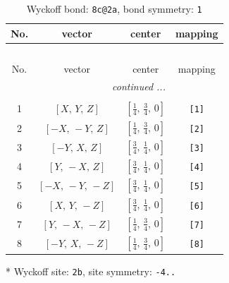\documentclass[fleqn,8pt]{jsarticle}
\begin{document}
\renewcommand{\arraystretch}{1.2}
\begin{longtable}{cccc}
\caption{Wyckoff bond: {\tt 8c@2a}, bond symmetry: {\tt 1}}
 \\
 \hline \hline
No. & vector & center & mapping \\ \hline \endfirsthead

\multicolumn{3}{l}{\tablename\ \thetable{}} \\
 \hline \hline
No. & vector & center & mapping \\ \hline \endhead

 \hline \hline
\multicolumn{3}{r}{\footnotesize\it continued ...} \\ \endfoot

 \hline \hline
\multicolumn{3}{r}{} \\ \endlastfoot

1 & $\left[ X,\, Y,\, Z \right]$ & $\left[ \frac{1}{4},\, \frac{3}{4},\, 0 \right]$ & {\tt [1]} \\ \hline
2 & $\left[ - X,\, - Y,\, Z \right]$ & $\left[ \frac{1}{4},\, \frac{3}{4},\, 0 \right]$ & {\tt [2]} \\ \hline
3 & $\left[ - Y,\, X,\, Z \right]$ & $\left[ \frac{3}{4},\, \frac{1}{4},\, 0 \right]$ & {\tt [3]} \\ \hline
4 & $\left[ Y,\, - X,\, Z \right]$ & $\left[ \frac{3}{4},\, \frac{1}{4},\, 0 \right]$ & {\tt [4]} \\ \hline
5 & $\left[ - X,\, - Y,\, - Z \right]$ & $\left[ \frac{3}{4},\, \frac{1}{4},\, 0 \right]$ & {\tt [5]} \\ \hline
6 & $\left[ X,\, Y,\, - Z \right]$ & $\left[ \frac{3}{4},\, \frac{1}{4},\, 0 \right]$ & {\tt [6]} \\ \hline
7 & $\left[ Y,\, - X,\, - Z \right]$ & $\left[ \frac{1}{4},\, \frac{3}{4},\, 0 \right]$ & {\tt [7]} \\ \hline
8 & $\left[ - Y,\, X,\, - Z \right]$ & $\left[ \frac{1}{4},\, \frac{3}{4},\, 0 \right]$ & {\tt [8]} \\
\end{longtable}
* Wyckoff site: {\tt 2b}, site symmetry: {\tt -4..}
\renewcommand{\arraystretch}{1.2}
\end{document}

